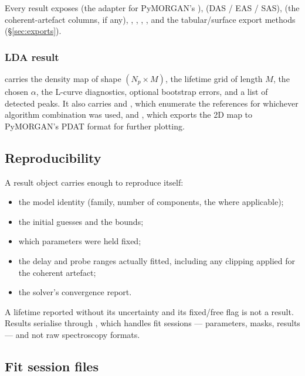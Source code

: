Every result exposes  (the adapter for PyMORGAN's
),  (DAS / EAS / SAS),
 (the coherent-artefact columns, if any),
, , ,
, and the tabular/surface export methods
(\S\ref{sec:exports}).

\subsubsection{LDA result}\label{sec:results-lda}

 carries the density map  of shape
$(N_p \times M)$, the lifetime grid  of length $M$, the chosen
$\alpha$, the L-curve diagnostics, optional bootstrap errors, and a list of
detected peaks. It also carries  and ,
which enumerate the references for whichever algorithm combination was used, and
, which exports the 2D map to PyMORGAN's PDAT format for
further plotting.

\subsection{Reproducibility}\label{sec:repro}

A result object carries enough to reproduce itself:

\begin{itemize}
  \item the model identity (family, number of components, the \Kmat{} where applicable);
  \item the initial guesses and the bounds;
  \item which parameters were held fixed;
  \item the delay and probe ranges actually fitted, including any clipping applied for the coherent artefact;
  \item the solver's convergence report.
\end{itemize}

A lifetime reported without its uncertainty and its fixed/free flag is not a
result. Results serialise through , which handles fit sessions
--- parameters, masks, results --- and not raw spectroscopy formats.

\subsection{Fit session files}\label{sec:sessions}

